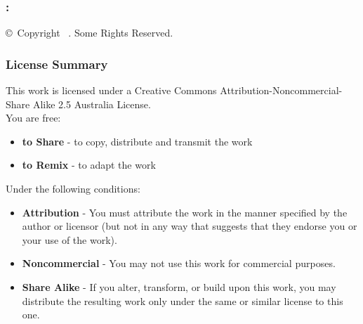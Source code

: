 
\newpage
\begin{flushleft}

\vspace*{\fill}
\subsubsection*{\mybooktitle: \mybooksubtitle}
\copyright\ Copyright \mybookdate\ \mybookauthor. Some Rights Reserved. \\

\subsubsection*{License Summary}
This work is licensed under a Creative Commons Attribution-Noncommercial-Share Alike 2.5 Australia License. \\

You are free:
\begin{itemize}
	\item \textbf{to Share} - to copy, distribute and transmit the work
	\item \textbf{to Remix} - to adapt the work
\end{itemize}

Under the following conditions:
\begin{itemize}
	\item \textbf{Attribution} - You must attribute the work in the manner specified by the author or licensor (but not in any way that suggests that they endorse you or your use of the work).
	\item \textbf{Noncommercial} - You may not use this work for commercial purposes.
	\item \textbf{Share Alike} - If you alter, transform, or build upon this work, you may distribute the resulting work only under the same or similar license to this one.
\end{itemize}


\end{flushleft}
